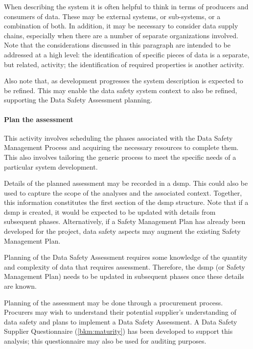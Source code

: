 When describing the system it is often helpful to think in terms of producers and consumers of data. These may be external systems, or sub-systems, or a combination of both. In addition, it may be necessary to consider data supply chains, especially when there are a number of separate organizations involved. Note that the considerations discussed in this paragraph are intended to be addressed at a high level: the identification of specific pieces of data is a separate, but related, activity; the identification of required properties is another activity.

Also note that, as development progresses the system description is expected to be refined. This may enable the data safety system context to also be refined, supporting the Data Safety Assessment planning.

\paragraph{Plan the assessment}
This activity involves scheduling the phases associated with the Data Safety Management Process and acquiring the necessary resources to complete them. This also involves tailoring the generic process to meet the specific needs of a particular system development. 

Details of the planned assessment may be recorded in a \gls{dsmp}. This could also be used to capture the scope of the analyses and the associated context. Together, this \gls{information} constitutes the first section of the \gls{dsmp} structure. Note that if a \gls{dsmp} is created, it would be expected to be updated with details from subsequent phases. Alternatively, if a Safety Management Plan has already been developed for the project, data safety aspects may augment the existing Safety Management Plan. 

Planning of the Data Safety Assessment requires some knowledge of the quantity and complexity of data that requires assessment. Therefore, the \gls{dsmp} (or Safety Management Plan) needs to be updated in subsequent phases once these details are known.

Planning of the assessment may be done through a procurement process. Procurers may wish to understand their potential supplier's understanding of data safety and plans to implement a Data Safety Assessment. A Data Safety Supplier Questionnaire (\autoref{bkm:maturity}) has been developed to support this analysis; this questionnaire may also be used for auditing purposes.

